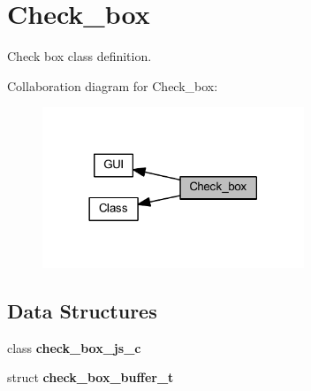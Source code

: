 \section{Check\+\_\+box}
\label{group___check__box}


Check box class definition.  


Collaboration diagram for Check\+\_\+box\+:
\nopagebreak
\begin{figure}[H]
\begin{center}
\leavevmode
\includegraphics[width=222pt]{group___check__box}
\end{center}
\end{figure}
\subsection*{Data Structures}
\begin{DoxyCompactItemize}
\item 
class \textbf{ check\+\_\+box\+\_\+js\+\_\+c}
\item 
struct \textbf{ check\+\_\+box\+\_\+buffer\+\_\+t}
\end{DoxyCompactItemize}
